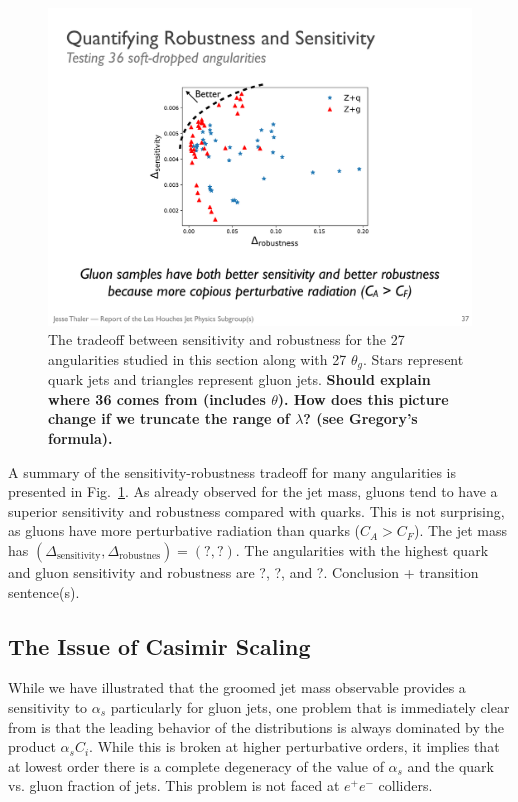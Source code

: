 \begin{figure}[h!]
\begin{center}
\includegraphics[width = 0.6\columnwidth]{figures/robseptradeoff.pdf}
\end{center}
\caption{The tradeoff between sensitivity and robustness for the 27 angularities studied in this section along with 27 $\theta_g$.  Stars represent quark jets and triangles represent gluon jets. \textbf{Should explain where 36 comes from (includes $\theta$).  How does this picture change if we truncate the range of $\lambda$?  (see Gregory's formula).}}
\label{fig:robseptradeoff}
\end{figure}

A summary of the sensitivity-robustness tradeoff for many angularities is presented in Fig.~\ref{fig:robseptradeoff}.  As already observed for the jet mass, gluons tend to have a superior sensitivity and robustness compared with quarks.  This is not surprising, as gluons have more perturbative radiation than quarks ($C_A>C_F$).  The jet mass has $(\Delta_\text{sensitivity},\Delta_\text{robustnes})=(?,?)$.  The angularities with the highest quark and gluon sensitivity and robustness are ?, ?, and ?.   Conclusion + transition sentence(s).









\subsection{The Issue of Casimir Scaling}
\label{sec:casimir}



While we have illustrated that the groomed jet mass observable provides a sensitivity to $\alpha_s$ particularly for gluon jets, one problem that is immediately clear from  is that the leading behavior of the distributions is always dominated by the product $\alpha_s C_i$. While this is broken at higher perturbative orders, it implies that at lowest order there is a complete degeneracy of the value of $\alpha_s$ and the quark vs. gluon fraction of jets. This problem is not faced at $e^+e^-$ colliders.

